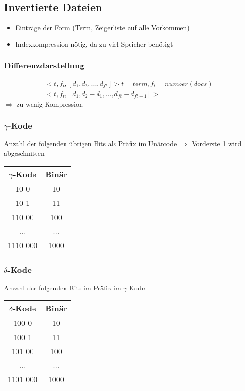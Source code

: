 \documentclass{article}
\begin{document}
\subsection{Invertierte Dateien}
\begin{itemize}
\item Einträge der Form (Term, Zeigerliste auf alle Vorkommen)
\item Indexkompression nötig, da zu viel Speicher benötigt
\end{itemize}
\subsubsection{Differenzdarstellung}
\begin{align*}
&<t, f_{t}, [d_{1}, d_{2}, ..., d_{ft}]> t=term, f_{t}= number(docs)\\
&<t, f_{t}, [d_{1}, d_{2}-d_{1}, ..., d_{ft}-d_{ft-1}]>
\end{align*}
$\Rightarrow$ zu wenig Kompression

\subsubsection{$\gamma$-Kode}
Anzahl der folgenden übrigen Bits als Präfix im Unärcode $\Rightarrow$ Vorderste 1 wird abgeschnitten\\
\begin{center}
\begin{tabular}{c|c}
$\gamma$-Kode & Binär \\
\hline
10 0 & 10\\
10 1 & 11\\
110 00 & 100\\
... & ...\\
1110 000 & 1000

\end{tabular}
\end{center}
\subsubsection{$\delta$-Kode}
Anzahl der folgenden Bits im Präfix im $\gamma$-Kode \\

\begin{center}
\begin{tabular}{c|c}
$\delta$-Kode & Binär \\
\hline
100 0 & 10\\
100 1 & 11\\
101 00 & 100\\
... & ...\\
1101 000 & 1000

\end{tabular}
\end{center}
\end{document}
